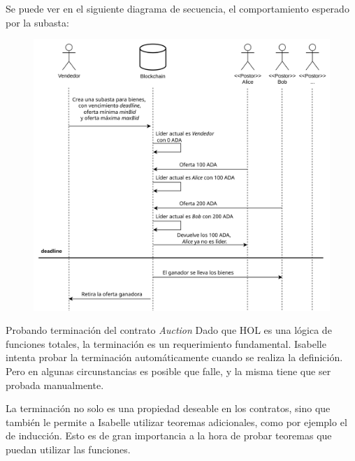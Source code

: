 \documentclass{beamer}
\begin{document}
\begin{frame}

Se puede ver en el siguiente diagrama de secuencia, el comportamiento esperado por la subasta:

\begin{figure}[H]
    \centering
    \includegraphics[height=0.8\textheight]{Auction.png}
\end{figure}

\end{frame}

\begin{frame}{Probando terminación del contrato \textit{Auction}}
Dado que HOL es una lógica de funciones totales, la terminación es un requerimiento fundamental. Isabelle intenta probar la terminación automáticamente cuando se realiza la definición. Pero en algunas circunstancias es posible que falle, y la misma tiene que ser probada manualmente.

\bigskip
\pause

La terminación no solo es una propiedad deseable en los contratos, sino que también le permite a Isabelle utilizar teoremas adicionales, como por ejemplo el de inducción. Esto es de gran importancia a la hora de probar teoremas que puedan utilizar las funciones.

\end{frame}
\end{document}
